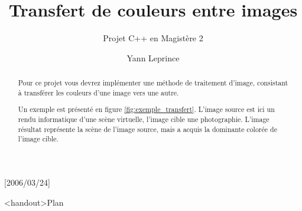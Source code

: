 \usepackage{fixltx2e}[2006/03/24]
\usepackage[utf8]{inputenc}
\usepackage[T1]{fontenc}
\usepackage{textcomp}
\usepackage{lmodern}
\usepackage[british,french]{babel}
\usepackage[babel]{microtype}
\usepackage{xspace} %
\usepackage{graphicx}
\usepackage[center,tight]{subfigure}
\usepackage{hyperref}

\usepackage{bm}
\usepackage{mathtools}
\usepackage[strict, separate-uncertainty, output-decimal-marker={,}]{siunitx}




\newcommand{\lAB}{\texorpdfstring{\ensuremath{l\alpha \beta}}{lαβ}\xspace}
\newcommand{\code}[1]{\textsf{#1}}

\title{Transfert de couleurs entre images}
\subtitle{Projet C++ en Magistère 2}
\author{Yann Leprince}


\rfoot{\footnotesize \today}


\frame{\maketitle}

\begin{frame}<handout>{Plan}
  \tableofcontents
\end{frame}


\begin{abstract}
Pour ce projet vous devrez implémenter une méthode de traitement d'image,
consistant à transférer les couleurs d'une image vers une autre.

Un exemple est présenté en figure \ref{fig:exemple_transfert}. L'image source
est ici un rendu informatique d'une scène virtuelle, l'image cible une
photographie. L'image résultat représente la scène de l'image source, mais a
acquis la dominante colorée de l'image cible.
\end{abstract}

